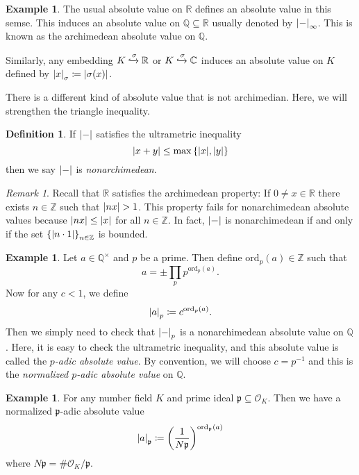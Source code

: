 \documentclass[leqno, openany]{memoir}
\theoremstyle{definition}
\newtheorem{defn}[thm]{Definition}
\newtheorem{exm}[thm]{Example}
\theoremstyle{remark}
\newtheorem{rmk}[thm]{Remark}
\theoremstyle{plain}
\theoremstyle{definition}
\theoremstyle{remark}
\newcommand{\R}{\mathbb{R}}
\newcommand{\C}{\mathbb{C}}
\newcommand{\Z}{\mathbb{Z}}
\newcommand{\Q}{\mathbb{Q}}
\newcommand{\mc}[1]{\mathcal{#1}}
\newcommand{\mf}[1]{\mathfrak{#1}}
\newcommand{\mr}[1]{\mathrm{#1}}
\begin{document}
\begin{exm}
    The usual absolute value on $\R$ defines an absolute value in this semse. This induces an absolute value on $\Q \subseteq \R$ usually denoted by $\abs{-}_{\infty}$. This is known as the archimedean absolute value on $\Q$.

    Similarly, any embedding $K \xhookrightarrow{\sigma} \R$ or $K \xhookrightarrow{\sigma} \C$ induces an absolute value on $K$ defined by $\abs{x}_{\sigma} \coloneqq \abs{\sigma(x)}$.
\end{exm}

There is a different kind of absolute value that is not archimedian. Here, we will strengthen the triangle inequality.

\begin{defn}
    If $\abs{-}$ satisfies the ultrametric inequality
    \[ \abs{x+y} \leq \max \qty{\abs{x}, \abs{y}} \]
    then we say $\abs{-}$ is \textit{nonarchimedean}. 
\end{defn}

\begin{rmk}
    Recall that $\R$ satisfies the archimedean property: If $0 \neq x \in \R$ there exists $n \in \Z$ such that $\abs{nx} > 1$. This property fails for nonarchimedean absolute values because $\abs{nx} \leq \abs{x}$ for all $n \in \Z$. In fact, $\abs{-}$ is nonarchimedean if and only if the set $\qty{\abs{n \cdot 1}}_{n \in \Z}$ is bounded.
\end{rmk}

\begin{exm}
    Let $a \in \Q^{\times}$ and $p$ be a prime. Then define $\mr{ord}_p(a) \in \Z$ such that
    \[ a = \pm \prod_{p} p^{\mr{ord}_p(a)}. \]
    Now for any $c < 1$, we define 
    \[ \abs{a}_p \coloneqq c^{\mr{ord}_p(a)}. \]
    Then we simply need to check that $\abs{-}_p$ is a nonarchimedean absolute value on $\Q$. Here, it is easy to check the ultrametric inequality, and this absolute value is called the \textit{$p$-adic absolute value}. By convention, we will choose $c = p^{-1}$ and this is the \textit{normalized $p$-adic absolute value} on $\Q$.  
\end{exm}

\begin{exm}
    For any number field $K$ and prime ideal $\mf{p} \subseteq \mc{O}_K$. Then we have a normalized $\mf{p}$-adic absolute value
    \[ \abs{a}_{\mf{p}} \coloneqq \qty(\frac{1}{N\mf{p}})^{\mr{ord}_{\mf{p}}(a)} \]
    where $N\mf{p} = \# \mc{O}_K / \mf{p}$.
\end{exm}
\end{document}
